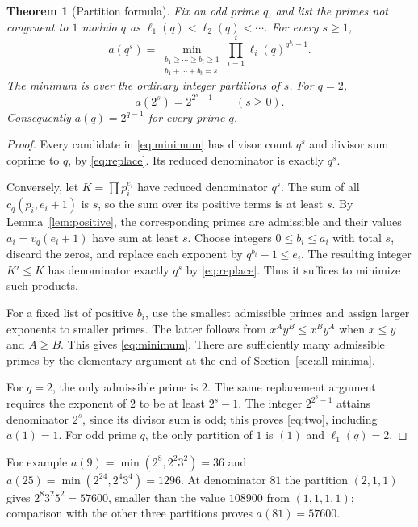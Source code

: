 \documentclass[10pt]{article}
\newtheorem{theorem}{Theorem}
\begin{document}
\begin{theorem}[Partition formula]\label{thm:partition}
Fix an odd prime $q$, and list the primes not congruent to $1$ modulo $q$
as $\ell_1(q)<\ell_2(q)<\cdots$. For every $s\ge1$,
\begin{equation}\label{eq:minimum}
 a(q^s)=\min_{\substack{b_1\ge\cdots\ge b_t\ge1\\b_1+\cdots+b_t=s}}
       \prod_{i=1}^t\ell_i(q)^{q^{b_i}-1}.
\end{equation}
The minimum is over the ordinary integer partitions of $s$. For $q=2$,
\begin{equation}\label{eq:two}
 a(2^s)=2^{2^s-1}\qquad(s\ge0).
\end{equation}
Consequently $a(q)=2^{q-1}$ for every prime $q$.
\end{theorem}
\begin{proof}
Every candidate in \eqref{eq:minimum} has divisor count $q^s$ and divisor
sum coprime to $q$, by \eqref{eq:replace}. Its reduced denominator is
exactly $q^s$.

Conversely, let $K=\prod p_i^{e_i}$ have reduced denominator $q^s$.
The sum of all $c_q(p_i,e_i+1)$ is $s$, so the sum over its positive
terms is at least $s$. By Lemma~\ref{lem:positive}, the corresponding
primes are admissible and their values $a_i=v_q(e_i+1)$ have sum at
least $s$. Choose integers $0\le b_i\le a_i$ with total $s$, discard the
zeros, and replace each exponent by $q^{b_i}-1\le e_i$. The resulting
integer $K'\le K$ has denominator exactly $q^s$ by
\eqref{eq:replace}. Thus it suffices to minimize such products.

For a fixed list of positive $b_i$, use the smallest admissible primes
and assign larger exponents to smaller primes. The latter follows from
$x^Ay^B\le x^By^A$ when $x\le y$ and $A\ge B$. This gives
\eqref{eq:minimum}. There are sufficiently many admissible primes by the elementary
argument at the end of Section~\ref{sec:all-minima}.

For $q=2$, the only admissible prime is $2$. The same replacement
argument requires the exponent of $2$ to be at least $2^s-1$.
The integer $2^{2^s-1}$ attains denominator $2^s$, since its divisor
sum is odd; this proves \eqref{eq:two}, including $a(1)=1$.
For odd prime $q$, the only partition of $1$ is $(1)$ and $\ell_1(q)=2$.
\end{proof}

For example $a(9)=\min(2^8,2^2 3^2)=36$ and
$a(25)=\min(2^{24},2^4 3^4)=1296$.
At denominator $81$ the partition $(2,1,1)$ gives
$2^8 3^2 5^2=57600$, smaller than the value $108900$ from $(1,1,1,1)$;
comparison with the other three partitions proves $a(81)=57600$.
\end{document}
